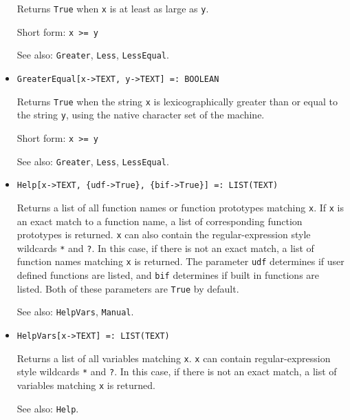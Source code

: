 \begin{itemize}
\bd
Returns \verb+True+ when \verb+x+ is at least as large as \verb+y+.
\item
[Short form:] \verb+x >= y+
\item
[See also:] \verb+Greater+, \verb+Less+, \verb+LessEqual+.
\ed

\item{}
\protect \large \begin{verbatim}
GreaterEqual[x->TEXT, y->TEXT] =: BOOLEAN 
\end{verbatim}\normalsize

\bd
Returns \verb+True+ when the string \verb+x+ is lexicographically greater than
or equal to the string \verb+y+, using the native character set of the
machine.
\item
[Short form:] \verb+x >= y+
\item
[See also:] {\tt Greater}, {\tt Less}, {\tt LessEqual}.
\ed



\item{}
\protect \large \begin{verbatim}
Help[x->TEXT, {udf->True}, {bif->True}] =: LIST(TEXT) 
\end{verbatim}\normalsize

\bd 
Returns a list of all function names or function prototypes matching
\verb+x+.  If \verb+x+ is an exact match to a function name, a list of
corresponding function prototypes is returned.  \verb+x+ can also
contain the regular-expression style wildcards \verb+*+ and \verb+?+.
In this case, if there is not an exact match, a list of function names
matching \verb+x+ is returned.  The parameter \verb+udf+ determines if
user defined functions are listed, and \verb+bif+ determines if built
in functions are listed.  Both of these parameters are \verb+True+ by
default.
\item
[See also:] \verb+HelpVars+, \verb+Manual+.
\ed

\item{}
\protect \large \begin{verbatim}
HelpVars[x->TEXT] =: LIST(TEXT) 
\end{verbatim}\normalsize

\bd 
Returns a list of all variables matching \verb+x+.  \verb+x+ can
contain regular-expression style wildcards \verb+*+ and \verb+?+. 
In this case,
if there is not an exact match, a list of variables matching \verb+x+
is returned.
\item [See also:] \verb+Help+.
\ed


\end{itemize}
